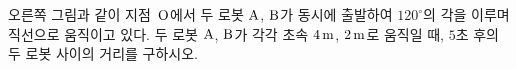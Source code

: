 \noindent\begin{minipage}[t]{0.58\linewidth}\vspace{0pt}\raggedright 오른쪽 그림과 같이 지점~$\mathrm{O}$에서 두 로봇 $\mathrm{A}$, $\mathrm{B}$가 동시에 출발하여 $120^\circ$의 각을 이루며 직선으로 움직이고 있다. 두 로봇 $\mathrm{A}$, $\mathrm{B}$가 각각 초속 $4\mkern3mu \mathrm{m}$, $2\mkern3mu \mathrm{m}$로 움직일 때, $5$초 후의 두 로봇 사이의 거리를 구하시오. \end{minipage}\hfill\begin{minipage}[t]{0.4\linewidth}\vspace{0pt}\centering \resizebox{\ifdim\width>\linewidth\linewidth\else\width\fi}{!}{}\end{minipage}\par
